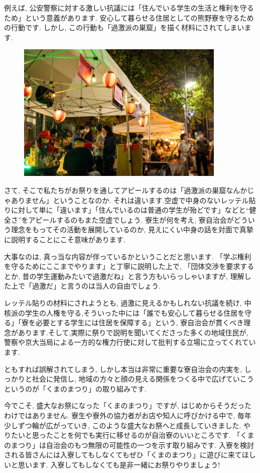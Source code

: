 例えば, 公安警察に対する激しい抗議には「住んでいる学生の生活と権利を守るため」という意義があります. 安心して暮らせる住居としての熊野寮を守るための行動です. しかし, この行動も「過激派の巣窟」を描く材料にされてしまいます.


\begin{figure}[H]
  \centering
  \includegraphics[width=10cm]{gazo/kumanomaturi1.pdf}
\end{figure}

さて, そこで私たちがお祭りを通してアピールするのは「過激派の巣窟なんかじゃありません」ということなのか. それは違います.空虚で中身のないレッテル貼りに対して単に「違います」「住んでいるのは普通の学生が殆どです」などと“健全さ”をアピールするのもまた空虚でしょう. 寮生が何を考え, 寮自治会がどういう理念をもってその活動を展開しているのか, 見えにくい中身の話を対面で真摯に説明することにこそ意味があります.

大事なのは, 真っ当な内容が伴っているかということだと思います. 「学ぶ権利を守るためにここまでやります」と丁寧に説明した上で, 「団体交渉を要求するとか, 昔の学生運動みたいで過激だね」と言う方もいらっしゃいますが, 理解した上で「過激だ」と言うのは当人の自由でしょう.

レッテル貼りの材料にされようとも, 過激に見えるかもしれない抗議を続け, 中核派の学生の人権を守る,そういった中には「誰でも安心して暮らせる住居を守る」「寮を必要とする学生には住居を保障する」という, 寮自治会が貫くべき理念があります.そして,実際に祭りで説明を聞いてくださった多くの地域住民が, 警察や京大当局による一方的な権力行使に対して批判する立場に立ってくれています.

ともすれば誤解されてしまう, しかし本当は非常に重要な寮自治会の内実を, しっかりと社会に発信し, 地域の方々と顔の見える関係をつくる中で広げていこうというのが「くまのまつり」の取り組みです.

今でこそ, 盛大なお祭になった「くまのまつり」ですが, はじめからそうだったわけではありません. 寮生や寮外の協力者がお店や知人に呼びかける中で, 毎年少しずつ輪が広がっていき, このような盛大なお祭へと成長していきました. やりたいと思ったことを何でも実行に移せるのが自治寮のいいところです. 「くまのまつり」は自治会のもつ無限の可能性の一つを示す取り組みです. 入寮を検討される皆さんには入寮してもしなくてもぜひ「くまのまつり」に遊びに来てほしいと思います. 入寮してもしなくても是非一緒にお祭りやりましょう!

